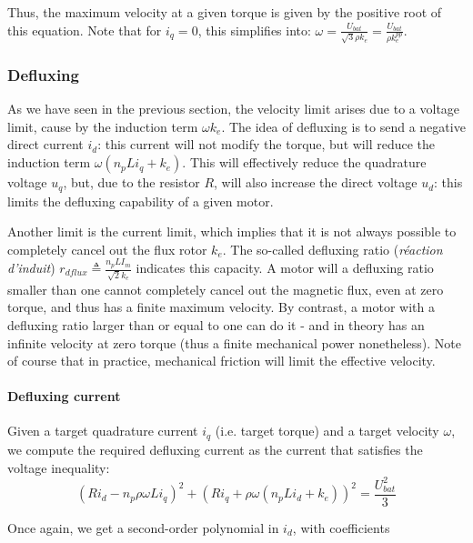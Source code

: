 \documentclass[a4paper,10pt]{article}
\begin{document}
Thus, the maximum velocity at a given torque is given by the positive root of this equation. Note that for $i_q=0$, this simplifies into: $ \omega = \frac{U_{bat}}{\sqrt{3}\rho k_e} = \frac{U_{bat}}{\rho k^{pp}_e}$.

\subsubsection{Defluxing}

As we have seen in the previous section, the velocity limit arises due to a voltage limit, cause by the induction term $\omega k_e$. The idea of defluxing is to send a negative direct current $i_d$: this current will not modify the torque, but will reduce the induction term $\omega (n_p L i_q + k_e)$. This will effectively reduce the quadrature voltage $u_q$, but, due to the resistor $R$, will also increase the direct voltage $u_d$: this limits the defluxing capability of a given motor.

Another limit is the current limit, which implies that it is not always possible to completely cancel out the flux rotor $k_e$. The so-called defluxing ratio (\emph{réaction d'induit}) $r_{dflux} \triangleq \frac{n_p L I_m}{\sqrt{2} k_e}$ indicates this capacity. A motor will a defluxing ratio smaller than one cannot completely cancel out the magnetic flux, even at zero torque, and thus has a finite maximum velocity. By contrast, a motor with a defluxing ratio larger than or equal to one can do it - and in theory has an infinite velocity at zero torque (thus a finite mechanical power nonetheless). Note of course that in practice, mechanical friction will limit the effective velocity.

\bigskip 

\paragraph{Defluxing current}

Given a target quadrature current $i_q$ (i.e. target torque) and a target velocity $\omega$, we compute the required defluxing current as the current that satisfies the voltage inequality:
\begin{equation}
	(R i_d - n_p \rho \omega L i_q) ^2 + (R i_q + \rho \omega (n_p L i_d + k_e))^2 = \frac{U_{bat}^2}{3}
	\label{eIneqDeflux}
\end{equation}

Once again, we get a second-order polynomial in $i_d$, with coefficients
\end{document}
